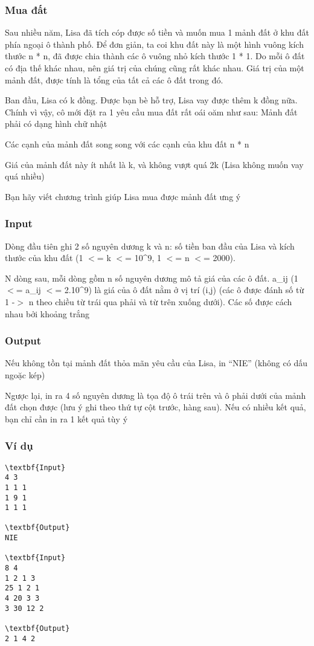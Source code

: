 



\subsubsection{   Mua đất  }

   Sau nhiều năm, Lisa đã tích cóp được số tiền và muốn mua 1 mảnh đất ở khu đất phía ngoại ô thành phố. Để đơn giản, ta coi khu đất này là một hình vuông kích thước n * n, đã được chia thành các ô vuông nhỏ kích thước 1 * 1. Do mỗi ô đất có địa thế khác nhau, nên giá trị của chúng cũng rất khác nhau. Giá trị của một mảnh đất, được tính là tổng của tất cả các ô đất trong đó.  

   Ban đầu, Lisa có k đồng. Được bạn bè hỗ trợ, Lisa vay được thêm k đồng nữa. Chính vì vậy, cô mới đặt ra 1 yêu cầu mua đất rất oái oăm như sau: Mảnh đất phải có dạng hình chữ nhật  

   Các cạnh của mảnh đất song song với các cạnh của khu đất n * n  

   Giá của mảnh đất này ít nhất là k, và không vượt quá 2k (Lisa không muốn vay quá nhiều)  

   Bạn hãy viết chương trình giúp Lisa mua được mảnh đất ưng ý  

\subsubsection{   Input  }

   Dòng đầu tiên ghi 2 số nguyên dương k và n: số tiền ban đầu của Lisa và kích thước của khu đất (1 $<$= k $<$= 10\textasciicircum9, 1 $<$= n $<$= 2000).  

   N dòng sau, mỗi dòng gồm n số nguyên dương mô tả giá của các ô đất. a\_ij (1 $<$= a­\_ij $<$= 2.10\textasciicircum9) là giá của ô đất nằm ở vị trí (i,j) (các ô được đánh số từ 1 -$>$ n theo chiều từ trái qua phải và từ trên xuống dưới). Các số được cách nhau bởi khoảng trắng  

\subsubsection{   Output  }

   Nếu không tồn tại mảnh đất thỏa mãn yêu cầu của Lisa, in “NIE” (không có dấu ngoặc kép)  

   Ngược lại, in ra 4 số nguyên dương là tọa độ ô trái trên và ô phải dưới của mảnh đất chọn được (lưu ý ghi theo thứ tự cột trước, hàng sau). Nếu có nhiều kết quả, bạn chỉ cần in ra 1 kết quả tùy ý  

\subsubsection{   Ví dụ  }
\begin{verbatim}
\textbf{Input}
4 3
1 1 1
1 9 1
1 1 1

\textbf{Output}
NIE

\textbf{Input}
8 4
1 2 1 3
25 1 2 1
4 20 3 3
3 30 12 2

\textbf{Output}
2 1 4 2
\end{verbatim}